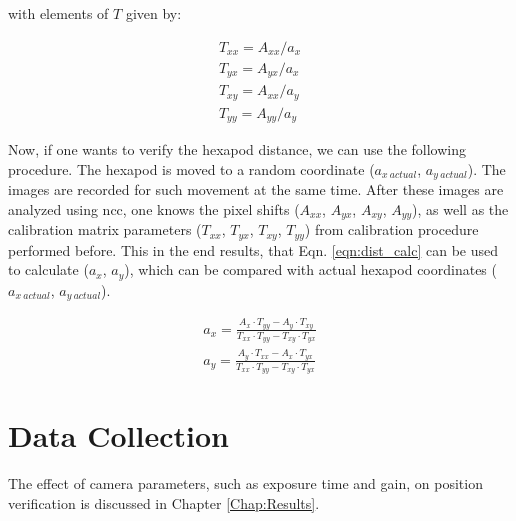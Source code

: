     \noindent with elements of $T$ given by:

    \begin{equation}\label{eqn:calib_matrix_param}
        \begin{aligned}
            T_{xx} = A_{xx} / a_x \\ 
            T_{yx} = A_{yx} / a_x \\
            T_{xy} = A_{xx} / a_y \\
            T_{yy} = A_{yy} / a_y 
        \end{aligned}
    \end{equation}

    \vspace{5mm}
    \noindent Now, if one wants to verify the hexapod distance, we can use the following procedure. The hexapod is moved to a random coordinate ($a_{x\ actual}$, $a_{y\ actual}$). The images are recorded for such movement at the same time. After these images are analyzed using \gls{ncc}, one knows the pixel shifts ($A_{xx}$, $A_{yx}$, $A_{xy}$, $A_{yy}$),  as well as the calibration matrix parameters ($T_{xx}$, $T_{yx}$, $T_{xy}$, $T_{yy}$) from calibration procedure performed before. This in the end results, that Eqn. \ref{eqn:dist_calc} can be used to calculate ($a_x$, $a_y$), which can be compared with actual hexapod coordinates ($a_{x\ actual}$, $a_{y\ actual}$). 

    \begin{equation}\label{eqn:dist_calc}
        \begin{aligned}
            a_x = \frac{A_x \cdot T_{yy} - A_y \cdot T_{xy}}{T_{xx} \cdot T_{yy} - T_{xy} \cdot T_{yx}} \\
            a_y = \frac{A_y \cdot T_{xx} - A_x \cdot T_{yx}}{T_{xx} \cdot T_{yy} - T_{xy} \cdot T_{yx}}
        \end{aligned}
    \end{equation}

\section{Data Collection}\label{section:data_collection}
The effect of camera parameters, such as exposure time and gain, on position verification is discussed in Chapter \ref{Chap:Results}. 

